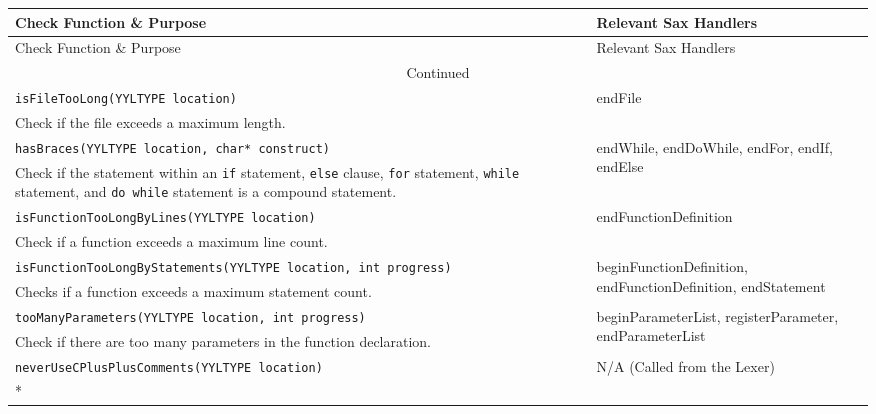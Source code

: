\documentclass[12pt]{report}
\begin{document}
\begin{longtable}{p{10cm} p{\saxColSize}}
\toprule
Check Function \& Purpose & Relevant Sax Handlers \\ \midrule
\endfirsthead
\toprule
Check Function \& Purpose & Relevant Sax Handlers \\ \midrule
\endhead
\hline
\multicolumn{2}{c}{Continued}\\
\bottomrule
\endfoot
\bottomrule
\endlastfoot

		\lstinline!isFileTooLong(YYLTYPE location)! & \multirow{2}{\saxColSize}{endFile} \\*
			 Check if the file exceeds a maximum length.  \vspace{\vertSize} \\
		\lstinline!hasBraces(YYLTYPE location, char* construct)! & \multirow{2}{\saxColSize}{endWhile, endDoWhile, endFor, endIf, endElse} \\*
			 Check if the statement within an \lstinline!if! statement, \lstinline!else! clause, \lstinline!for! statement, \lstinline!while! statement, and \lstinline!do while! statement is a compound statement. \vspace{\vertSize} \\
		\lstinline!isFunctionTooLongByLines(YYLTYPE location)! & \multirow{2}{\saxColSize}{endFunctionDefinition} \\*
			 Check if a function exceeds a maximum line count. \vspace{\vertSize} \\
		\lstinline!isFunctionTooLongByStatements(YYLTYPE location, int progress)! & \multirow{2}{\saxColSize}{beginFunctionDefinition, endFunctionDefinition, endStatement} \\*
			 Checks if a function exceeds a maximum statement count. \vspace{\vertSize} \\
		\lstinline!tooManyParameters(YYLTYPE location, int progress)! & \multirow{2}{\saxColSize}{beginParameterList, registerParameter, endParameterList} \\*
			 Check if there are too many parameters in the function declaration. \vspace{\vertSize} \\
		\lstinline!neverUseCPlusPlusComments(YYLTYPE location)! & \multirow{2}{\saxColSize}{N/A (Called from the Lexer)} \\ *

\end{longtable}
\end{document}
